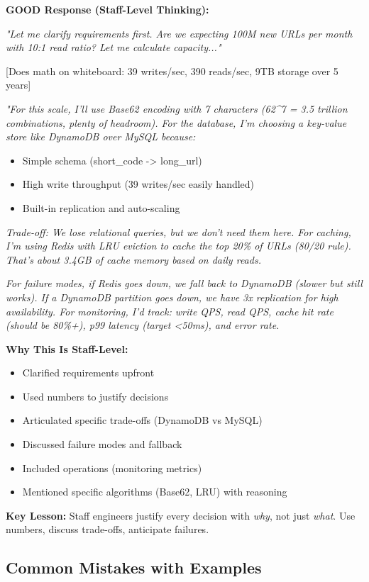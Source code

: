\documentclass[10pt]{article}
\begin{document}
\textbf{GOOD Response (Staff-Level Thinking):}

\textit{"Let me clarify requirements first. Are we expecting 100M new URLs per month with 10:1 read ratio? Let me calculate capacity..."}

[Does math on whiteboard: 39 writes/sec, 390 reads/sec, 9TB storage over 5 years]

\textit{"For this scale, I'll use Base62 encoding with 7 characters (62\^{}7 = 3.5 trillion combinations, plenty of headroom). For the database, I'm choosing a key-value store like DynamoDB over MySQL because:}
\begin{itemize}
\item Simple schema (short\_code -> long\_url)
\item High write throughput (39 writes/sec easily handled)
\item Built-in replication and auto-scaling
\end{itemize}

\textit{Trade-off: We lose relational queries, but we don't need them here. For caching, I'm using Redis with LRU eviction to cache the top 20\% of URLs (80/20 rule). That's about 3.4GB of cache memory based on daily reads.}

\textit{For failure modes, if Redis goes down, we fall back to DynamoDB (slower but still works). If a DynamoDB partition goes down, we have 3x replication for high availability. For monitoring, I'd track: write QPS, read QPS, cache hit rate (should be 80\%+), p99 latency (target <50ms), and error rate.}

\textbf{Why This Is Staff-Level:}
\begin{itemize}
\item Clarified requirements upfront
\item Used numbers to justify decisions
\item Articulated specific trade-offs (DynamoDB vs MySQL)
\item Discussed failure modes and fallback
\item Included operations (monitoring metrics)
\item Mentioned specific algorithms (Base62, LRU) with reasoning
\end{itemize}

\textbf{Key Lesson:} Staff engineers justify every decision with \textit{why}, not just \textit{what}. Use numbers, discuss trade-offs, anticipate failures.

\subsection{Common Mistakes with Examples}
\end{document}
